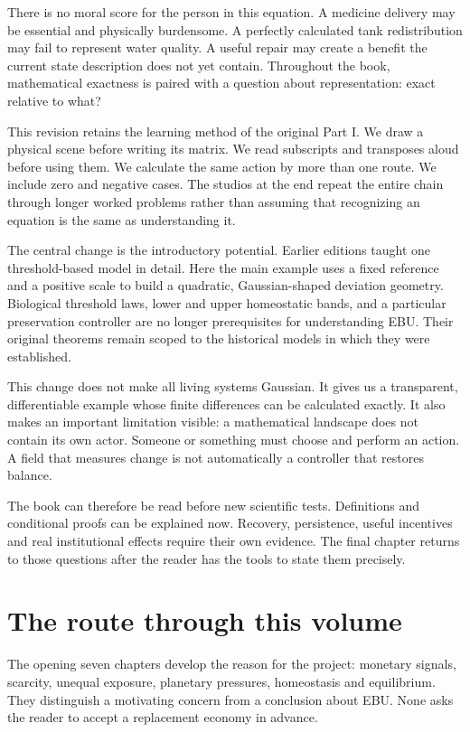 There is no moral score for the person in this equation. A medicine delivery may be essential and physically burdensome. A perfectly calculated tank redistribution may fail to represent water quality. A useful repair may create a benefit the current state description does not yet contain. Throughout the book, mathematical exactness is paired with a question about representation: exact relative to what?

This revision retains the learning method of the original Part I. We draw a physical scene before writing its matrix. We read subscripts and transposes aloud before using them. We calculate the same action by more than one route. We include zero and negative cases. The studios at the end repeat the entire chain through longer worked problems rather than assuming that recognizing an equation is the same as understanding it.

The central change is the introductory potential. Earlier editions taught one threshold-based model in detail. Here the main example uses a fixed reference and a positive scale to build a quadratic, Gaussian-shaped deviation geometry. Biological threshold laws, lower and upper homeostatic bands, and a particular preservation controller are no longer prerequisites for understanding EBU. Their original theorems remain scoped to the historical models in which they were established.

This change does not make all living systems Gaussian. It gives us a transparent, differentiable example whose finite differences can be calculated exactly. It also makes an important limitation visible: a mathematical landscape does not contain its own actor. Someone or something must choose and perform an action. A field that measures change is not automatically a controller that restores balance.

The book can therefore be read before new scientific tests. Definitions and conditional proofs can be explained now. Recovery, persistence, useful incentives and real institutional effects require their own evidence. The final chapter returns to those questions after the reader has the tools to state them precisely.

\chapter*{The route through this volume}
The opening seven chapters develop the reason for the project: monetary signals, scarcity, unequal exposure, planetary pressures, homeostasis and equilibrium. They distinguish a motivating concern from a conclusion about EBU. None asks the reader to accept a replacement economy in advance.

